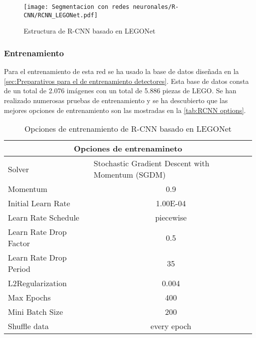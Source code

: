 \begin{figure}[ht]  %
	\centering
	\texttt{[image: Segmentacion con redes neuronales/R-CNN/RCNN\_LEGONet.pdf]}
	\caption{Estructura de R-CNN basado en LEGONet}
	\label{fig:R-CNN_LEGONet estructura}
\end{figure}


\subsubsection*{Entrenamiento}
\label{subsubsec:Entrenamiento R-CNN_LEGONet}
Para el entrenamiento de esta red se ha usado la base de datos diseñada en la \autoref{sec:Preparativos para el de entrenamiento detectores}. Esta base de datos consta de un total de 2.076 imágenes con un total de 5.886 piezas de LEGO. Se han realizado numerosas pruebas de entrenamiento y se ha descubierto que las mejores opciones de entrenamiento son las mostradas en la \autoref{tab:RCNN options}.

\begin{table}[ht]
  \centering
    \begin{tabular}{|l|c|}
    \hline
    \multicolumn{2}{|c|}{Opciones de entrenamineto} \\
    \hline
    Solver & \multicolumn{1}{l|}{Stochastic Gradient Descent with Momentum (SGDM)} \\
    \hline
    Momentum & 0.9 \\
    \hline
    Initial Learn Rate & 1.00E-04 \\
    \hline
    Learn Rate Schedule & piecewise \\
    \hline
    Learn Rate Drop Factor & 0.5 \\
    \hline
    Learn Rate Drop Period & 35 \\
    \hline
    L2Regularization & 0.004 \\
    \hline
    Max Epochs & 400 \\
    \hline
    Mini Batch Size & 200 \\
    \hline
    Shuffle data & every epoch \\
    \hline
    \end{tabular}%
  \caption{Opciones de entrenamiento de R-CNN basado en LEGONet}
  \label{tab:RCNN options}%
\end{table}%

